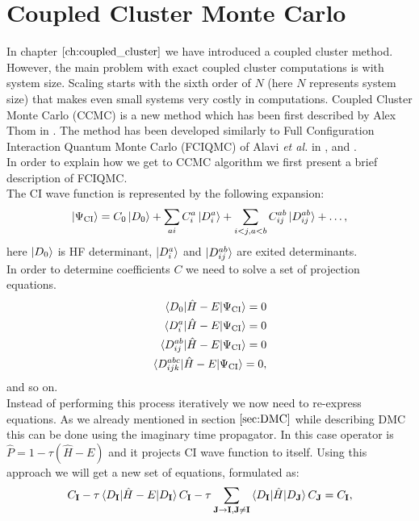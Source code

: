 \documentclass[twoside,english]{uiofysmaster}
\theoremstyle{definition}
\begin{document}
\section{Coupled Cluster Monte Carlo}
In chapter $\ref{ch:coupled_cluster}$ we have introduced a coupled cluster method. However, the main problem with exact coupled cluster computations is with system size. Scaling starts with the sixth order of $N$ (here $N$ represents system size) that makes even small systems very costly in computations. Coupled Cluster Monte Carlo (CCMC) is a new method which has been first described by Alex Thom in \cite{thomStochasticCoupledCluster2010}. The method has been developed similarly to Full Configuration Interaction Quantum Monte Carlo (FCIQMC) of Alavi \textit{et al.} in \cite{boothFermionMonteCarlo2009}, \cite{clelandCommunicationsSurvivalFittest2010} and \cite{boothApproachingChemicalAccuracy2010}.\\
In order to explain how we get to CCMC algorithm we first present a brief description of FCIQMC. \\
The CI wave function is represented by the following expansion:
 \begin{equation}
\ket{\Psi_{\text{CI}}}= C_0\ket{D_0} + \sum_{ai} C_i^a \ket{D_i^a} + \sum_{i<j,a<b}C_{ij}^{ab}\ket{D_{ij}^{ab}} + \dots,
 \end{equation}
here $\ket{D_0}$ is HF determinant, $\ket{D_i^a}$ and $\ket{D_{ij}^{ab}}$ are exited determinants.\\
In order to determine coefficients $C$ we need to solve a set of projection equations. 
\begin{align}
\braket{D_0|\hat{H}-E|\Psi_{\text{CI}}}=0\\
\braket{D_i^a|\hat{H}-E|\Psi_{\text{CI}}}=0\\
\braket{D_{ij}^{ab}|\hat{H}-E|\Psi_{\text{CI}}}=0\\
\braket{D_{ijk}^{abc}|\hat{H}-E|\Psi_{\text{CI}}}=0,
\end{align} 
and so on.\\
Instead of performing this process iteratively we now need to re-express equations. As we already mentioned in section $\ref{sec:DMC}$ while describing DMC this can be done using the imaginary time propagator. In this case operator is $\hat{P}=1-\tau(\hat{H}-E)$ and it projects CI wave function to itself. Using this approach we will get a new set of equations, formulated as:
\begin{equation}
C_{\textbf{I}} - \tau \braket{D_{\textbf{I}}|\hat{H}-E|D_{\textbf{I}}}C_{\textbf{I}} - \tau \sum_{\textbf{J}\rightarrow \textbf{I},\textbf{J}\neq \textbf{I} }  \braket{D_{\textbf{I}}|\hat{H}|D_{\textbf{J}}}C_{\textbf{J}} = C_{\textbf{I}},
\end{equation}
\end{document}
